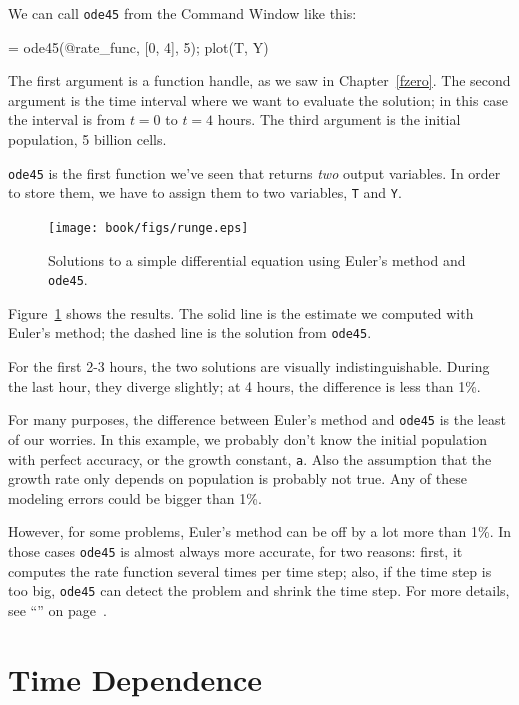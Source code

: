We can call {\tt ode45} from the Command Window like this:

\begin{code}
[T, Y] = ode45(@rate_func, [0, 4], 5);
plot(T, Y)
\end{code}

The first argument is a function handle, as we saw in Chapter~\ref{fzero}.  The second argument is the time interval where we want to evaluate the solution; in this case the interval is from $t=0$ to $t=4$ hours.  The third argument is the initial population, 5 billion cells.


{\tt ode45} is the first function we've seen that returns {\em two} output variables.
In order to store them, we have to assign them to two variables, {\tt T} and {\tt Y}.

\begin{figure}[ht]
\centerline{\texttt{[image: book/figs/runge.eps]}}
\caption{Solutions to a simple differential equation using Euler's method and {\tt ode45}.}
\label{fig:runge}
\end{figure}

Figure~\ref{fig:runge} shows the results.  The solid line is the estimate we computed with Euler's method; the dashed line is the solution from {\tt ode45}.

For the first 2-3 hours, the two solutions are visually indistinguishable.  During the last hour, they diverge slightly; at 4 hours, the difference is less than 1\%.

For many purposes, the difference between Euler's method and {\tt ode45} is the least of our worries.  In this example, we probably don't know the initial population with perfect accuracy, or the growth constant, {\tt a}.  Also the assumption that the growth rate only depends on population is probably not true.  Any of these modeling errors could be bigger than 1\%.

However, for some problems, Euler's method can be off by a lot more than 1\%.  
In those cases {\tt ode45} is almost always more accurate, for two reasons: first, it computes the rate function several times per time step; also, if the time step is too big, {\tt ode45} can detect the problem and shrink the time step.  For more details, see ``'' on page~\pageref{howode45}.


\section{Time Dependence}

